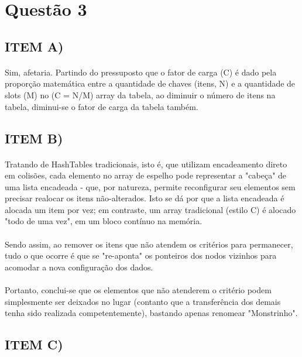 \documentclass[12pt, letterpaper]{article}
\begin{document}
\newpage
\section{Questão 3}
\subsection{ITEM A)}
\paragraph{}
Sim, afetaria. Partindo do pressuposto que o fator de carga (C) é dado pela proporção
matemática entre a quantidade de chaves (itens, N) e a quantidade de slots (M) no
(C = N/M) array da tabela, ao diminuir o número de itens na tabela, diminui-se o fator
de carga da tabela também.

\subsection{ITEM B)}
\paragraph{}
Tratando de HashTables tradicionais, isto é, que utilizam encadeamento direto em colisões,
cada elemento no array de espelho pode representar a "cabeça" de uma lista encadeada - que,
por natureza, permite reconfigurar seu elementos sem precisar realocar os itens
não-alterados. Isto se dá por que a lista encadeada é alocada um item por vez;
em contraste, um array tradicional (estilo C) é alocado "todo de uma vez", em um bloco
contínuo na memória.

\paragraph{}
Sendo assim, ao remover os itens que não atendem os critérios para permanecer, tudo o
que ocorre é que se "re-aponta" os ponteiros dos nodos vizinhos para acomodar a nova
configuração dos dados.

\paragraph{}
Portanto, conclui-se que os  elementos que não atenderem o critério podem simplesmente
ser deixados no lugar (contanto que a transferência dos demais tenha sido realizada
competentemente), bastando apenas renomear "Monstrinho".

\subsection{ITEM C)}
\end{document}
